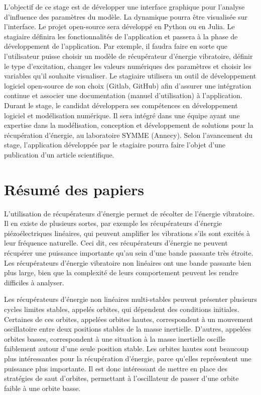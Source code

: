\documentclass[a4paper, french, 12pt, titlepage]{report}
\begin{document}
L’objectif de ce stage est de développer une interface graphique pour l’analyse d’influence des paramètres du modèle. La dynamique pourra être visualisée sur l’interface. Le projet open-source sera développé en Python ou en Julia. Le stagiaire définira les fonctionnalités de l’application et passera à la phase de développement de l’application. Par exemple, il faudra faire en sorte que l’utilisateur puisse choisir un modèle de récupérateur d’énergie vibratoire, définir le type d’excitation, changer les valeurs numériques des paramètres et choisir les variables qu’il souhaite visualiser. Le stagiaire utilisera un outil de développement logiciel open-source de son choix (Gitlab, GitHub) afin d’assurer une intégration continue et associer une documentation (manuel d’utilisation) à l’application. Durant le stage, le candidat développera ses compétences en développement logiciel et modélisation numérique. Il sera intégré dans une équipe ayant une expertise dans la modélisation, conception et développement de solutions pour la récupération d’énergie, au laboratoire SYMME (Annecy). Selon l’avancement du stage, l’application développée par le stagiaire pourra faire l’objet d’une publication d’un article scientifique.




\section{Résumé des papiers}

L'utilisation de récupérateurs d'énergie permet de récolter de l'énergie vibratoire. Il en existe de plusieurs sortes, par exemple les récupérateurs d'énergie piézoélectriques linéaires, qui peuvent amplifier les vibrations s'ils sont excités à leur fréquence naturelle. Ceci dit, ces récupérateurs d'énergie ne peuvent récupérer une puissance importante qu'au sein d'une bande passante très étroite. Les récupérateurs d'énergie vibratoire non linéaires ont une bande passante bien plus large, bien que la complexité de leurs comportement peuvent les rendre difficiles à analyser. 

Les récupérateurs d'énergie non linéaires multi-stables peuvent présenter plusieurs cycles limites stables, appelés orbites, qui dépendent des conditions initiales. Certaines de ces orbites, appelées orbites hautes, correspondent à un mouvement oscillatoire entre deux positions stables de la masse inertielle. D'autres, appelées orbites basses, correspondent à une situation à la masse inertielle oscille faiblement autour d'une seule position stable. Les orbites hautes sont beaucoup plus intéressantes pour la récupération d'énergie, parce qu'elles représentent une puissance plus importante. Il est donc intéressant de mettre en place des stratégies de saut d'orbites, permettant à l'oscillateur de passer d'une orbite faible à une orbite basse. 
\end{document}
